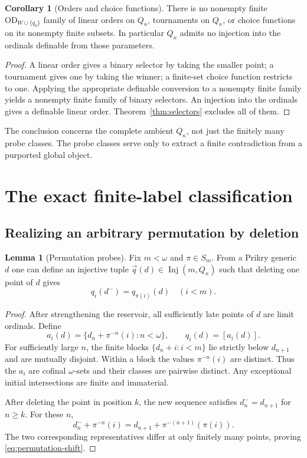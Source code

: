 \documentclass[11pt,letterpaper]{article}
\theoremstyle{definition}
\newtheorem{lemma}[definition]{Lemma}
\newtheorem{corollary}[definition]{Corollary}
\numberwithin{equation}{section}
\newcommand{\OD}{\mathrm{OD}}
\newcommand{\Inj}{\operatorname{Inj}}
\begin{document}
\begin{corollary}[Orders and choice functions]\label{cor:ordersnew}
There is no nonempty finite $\OD_{W\cup\{q_0\}}$ family of linear orders on $Q_\kappa$, tournaments on $Q_\kappa$, or choice functions on its nonempty finite subsets. In particular $Q_\kappa$ admits no injection into the ordinals definable from those parameters.
\end{corollary}

\begin{proof}
A linear order gives a binary selector by taking the smaller point; a tournament gives one by taking the winner; a finite-set choice function restricts to one. Applying the appropriate definable conversion to a nonempty finite family yields a nonempty finite family of binary selectors. An injection into the ordinals gives a definable linear order. Theorem~\ref{thm:selectors} excludes all of them.
\end{proof}

The conclusion concerns the complete ambient $Q_\kappa$, not just the finitely many probe classes. The probe classes serve only to extract a finite contradiction from a purported global object.

\section{The exact finite-label classification}\label{sec:labels}

\subsection{Realizing an arbitrary permutation by deletion}

\begin{lemma}[Permutation probes]\label{lem:permutation}
Fix $m<\omega$ and $\pi\in S_m$. From a Prikry generic $d$ one can define an injective tuple $\vec q(d)\in\Inj(m,Q_\kappa)$ such that deleting one point of $d$ gives
\[
 q_i(d^-)=q_{\pi(i)}(d)\quad(i<m).
 \label{eq:permutation-shift}\tag{5}
\]
\end{lemma}

\begin{proof}
After strengthening the reservoir, all sufficiently late points of $d$ are limit ordinals. Define
\[
 a_i(d)=\{d_n+\pi^{-n}(i):n<\omega\},
 \qquad q_i(d)=[a_i(d)].
\]
For sufficiently large $n$, the finite blocks
$\{d_n+i:i<m\}$ lie strictly below $d_{n+1}$ and are mutually disjoint. Within a block the values $\pi^{-n}(i)$ are distinct. Thus the $a_i$ are cofinal $\omega$-sets and their classes are pairwise distinct. Any exceptional initial intersections are finite and immaterial.

After deleting the point in position $k$, the new sequence satisfies $d^-_n=d_{n+1}$ for $n\ge k$. For these $n$,
\[
 d^-_n+\pi^{-n}(i)
   =d_{n+1}+\pi^{-(n+1)}(\pi(i)).
\]
The two corresponding representatives differ at only finitely many points, proving \eqref{eq:permutation-shift}.
\end{proof}
\end{document}

